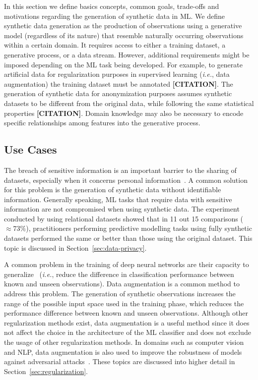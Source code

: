 \documentclass[parskip=full]{scrartcl}
\begin{document}
In this section we define basics concepts, common goals, trade-offs and
motivations regarding the generation of synthetic data in ML\@. We define
synthetic data generation as the production of observations using a generative
model (regardless of its nature) that resemble naturally occurring
observations within a certain domain. It requires access to either a training
dataset, a generative process, or a data stream. However, additional
requirements might be imposed depending on the ML task being developed. For
example, to generate artificial data for regularization purposes in supervised
learning (\textit{i.e.}, data augmentation) the training dataset must be
annotated \textbf{[CITATION]}. The generation of synthetic data for
anonymization purposes assumes synthetic datasets to be different from the
original data, while following the same statistical properties
\textbf{[CITATION]}. Domain knowledge may also be necessary to encode specific
relationships among features into the generative process.


\subsection{Use Cases}

The breach of sensitive information is an important barrier to the sharing of
datasets, especially when it concerns personal
information~\cite{dankar2021fake}. A common solution for this problem is the
generation of synthetic data without identifiable information. Generally
speaking, ML tasks that require data with sensitive information are not
compromised when using synthetic data.  The experiment conducted by
\citet{patki2016synthetic} using relational datasets showed that in 11 out 15
comparisons ($\approx 73\%$), practitioners performing predictive modelling
tasks using fully synthetic datasets performed the same or better than those
using the original dataset. This topic is discussed in
Section~\ref{sec:data-privacy}.

A common problem in the training of deep neural networks are their capacity to
generalize~\cite{Zhang2021} (\textit{i.e.}, reduce the difference in
classification performance between known and unseen observations). Data
augmentation is a common method to address this problem. The generation of
synthetic observations increases the range of the possible input space used in
the training phase, which reduces the performance difference between known and
unseen observations. Although other regularization methods exist, data
augmentation is a useful method since it does not affect the choice in the
architecture of the ML classifier and does not exclude the usage of other
regularization methods. In domains such as computer vision and NLP, data
augmentation is also used to improve the robustness of models against
adversarial attacks~\cite{zeng2020data, morris2020textattack}. These topics
are discussed into higher detail in Section~\ref{sec:regularization}.
\end{document}
